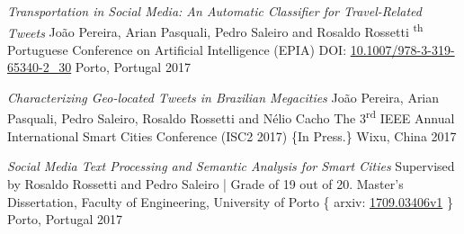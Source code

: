 

\begin{cvhonors}
   \cvhonor
    {\emph{Transportation in Social Media: An Automatic Classifier for Travel-Related Tweets}}
    {\textup{João Pereira, Arian Pasquali, Pedro Saleiro and Rosaldo Rossetti} \textsuperscript{th} Portuguese Conference on Artificial Intelligence (EPIA) \newline DOI: \href{https://doi.org/10.1007/978-3-319-65340-2_30}{10.1007/978-3-319-65340-2\_30}
    }
    {Porto, Portugal}
    {2017}
    
    \cvhonor
    {\emph{Characterizing Geo-located Tweets in Brazilian Megacities}}
    {\textup{João Pereira, Arian Pasquali, Pedro Saleiro, Rosaldo Rossetti and Nélio Cacho} \newline The 3\textsuperscript{rd} IEEE Annual International Smart Cities Conference (ISC2 2017) \{In Press.\}
    }
    {Wixu, China}
    {2017}
    
\end{cvhonors}
\begin{cvhonors}
  \cvhonor
    {\emph{Social Media Text Processing and Semantic Analysis for Smart Cities}}
    {Supervised by Rosaldo Rossetti and Pedro Saleiro | Grade of 19 out of 20. \newline 
    Master's Dissertation, Faculty of Engineering, University of Porto \{ arxiv: \href{arXiv:1709.03406v1}{1709.03406v1} \}}
    {Porto, Portugal}
    {2017}
\end{cvhonors}

